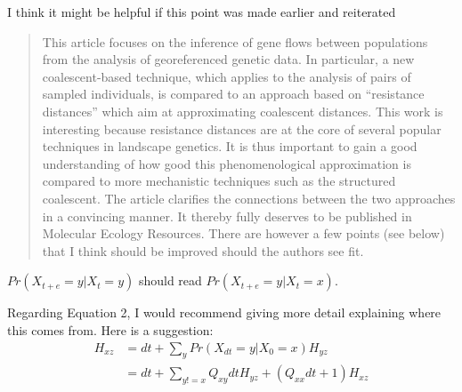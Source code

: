 \begin{point}{\revref}
    I think it  might be helpful if this point was made earlier and reiterated
\end{point}




\begin{quote}
    This article focuses on the inference of gene flows between populations from
    the analysis of georeferenced genetic data. In particular, a new
    coalescent-based technique, which applies to the analysis of pairs of
    sampled individuals, is compared to an approach based on ``resistance
    distances'' which aim at approximating coalescent distances. This work is
    interesting because resistance distances are at the core of several popular
    techniques in landscape genetics. It is thus important to gain a good
    understanding of how good this phenomenological approximation is compared
    to more mechanistic techniques such as the structured coalescent. The
    article clarifies the connections between the two approaches in a
    convincing manner. It thereby fully deserves to be published in Molecular
    Ecology Resources. There are however a few points (see below) that I think
    should be improved should the authors see fit.
\end{quote}



\begin{point}{}
    $Pr(X_{t+e}=y | X_t=y)$ should read $Pr(X_{t+e}=y | X_t=x)$.
\end{point}


\begin{point}{}
    Regarding Equation 2, I would recommend giving more detail explaining where
    this comes from. Here is a suggestion:
    \begin{align*}
        H_{xz} &= dt + \sum_y Pr(X_{dt} = y | X_0 = x) H_{yz} \\
               &= dt + \sum_{y != x} Q_{xy} dt H_{yz} + (Q_{xx} dt + 1) H_{xz}
    \end{align*}
\end{point}


